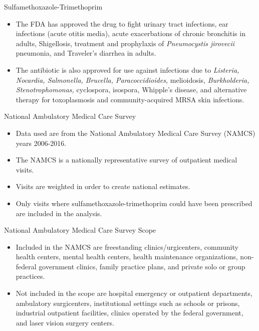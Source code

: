 \documentclass{beamer}
\begin{document}
\begin{frame}{Sulfamethoxazole-Trimethoprim}
\begin{itemize}
\item The FDA has approved the drug to fight urinary tract infections, ear infections (acute otitis media), acute exacerbations of chronic bronchitis in adults, Shigellosis, treatment and prophylaxis of \textit{Pneumocystis jirovecii} pneumonia, and Traveler's diarrhea in adults.
\item The antibiotic is also approved for use against infections due to \textit{Listeria, Nocardia, Salmonella, Brucella, Paracoccidioides,} melioidosis, \textit{Burkholderia, Stenotrophomonas,} cyclospora, isospora, Whipple's disease, and alternative therapy for toxoplasmosis and community-acquired MRSA skin infections.
\end{itemize}
\end{frame}

\begin{frame}{National Ambulatory Medical Care Survey}
\begin{itemize}
\item Data used are from the National Ambulatory Medical Care Survey (NAMCS) years 2006-2016.
\item The NAMCS is a nationally representative survey of outpatient medical visits.
\item Visits are weighted in order to create national estimates.
\item Only visits where sulfamethoxazole-trimethoprim could have been prescribed are included in the analysis.
\end{itemize}
\end{frame}

\begin{frame}{National Ambulatory Medical Care Survey Scope}
\begin{itemize}
\item Included in the NAMCS are freestanding clinics/urgicenters, community health centers, mental health centers, health maintenance organizations,  non-federal government clinics, family practice plans, and private solo or group practices.
\item Not included in the scope are hospital emergency or outpatient departments, ambulatory surgicenters, institutional settings such as schools or prisons, industrial outpatient facilities, clinics operated by the federal government, and laser vision surgery centers.
\end{itemize}
\end{frame}
\end{document}
